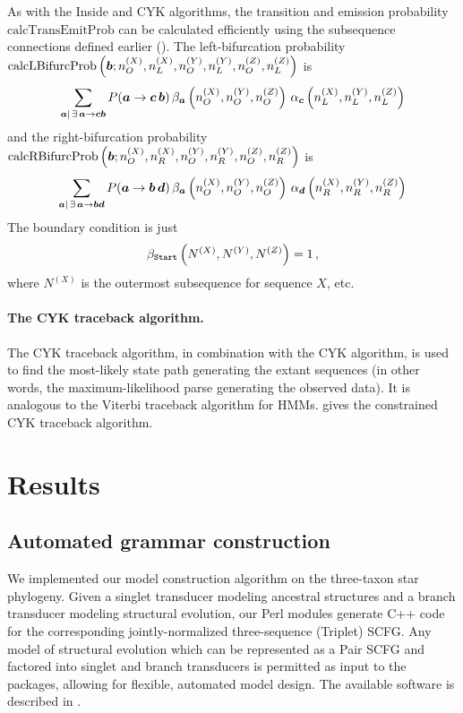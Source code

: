 \documentclass[10pt]{article}
\begin{document}
As with the Inside and CYK algorithms, the transition and emission probability $\mathrm{calcTransEmitProb}$ can be calculated efficiently using the subsequence connections defined earlier ().
The left-bifurcation probability $\mathrm{calcLBifurcProb}\left( \boldsymbol{b}; n^{(X)}_O,n^{(X)}_L,n^{(Y)}_O,n^{(Y)}_L,n^{(Z)}_O,n^{(Z)}_L \right)$ is
\[ \sum_{\boldsymbol{a}|\,\exists\, \boldsymbol{a}\to\boldsymbol{c}\boldsymbol{b}} P (\boldsymbol{a}\to\boldsymbol{c}\,\boldsymbol{b}) \, \beta_{\boldsymbol{a}}\left( n^{(X)}_O,n^{(Y)}_O,n^{(Z)}_O\right) \, \alpha_{\boldsymbol{c}}\left( n^{(X)}_L,n^{(Y)}_L,n^{(Z)}_L\right) \]
and the right-bifurcation probability $\mathrm{calcRBifurcProb}\left( \boldsymbol{b}; n^{(X)}_O,n^{(X)}_R,n^{(Y)}_O,n^{(Y)}_R,n^{(Z)}_O,n^{(Z)}_R \right)$ is
\[ \sum_{\boldsymbol{a}|\,\exists\, \boldsymbol{a}\to\boldsymbol{b}\boldsymbol{d}} P (\boldsymbol{a}\to\boldsymbol{b}\,\boldsymbol{d}) \, \beta_{\boldsymbol{a}}\left( n^{(X)}_O,n^{(Y)}_O,n^{(Z)}_O\right) \, \alpha_{\boldsymbol{d}}\left( n^{(X)}_R,n^{(Y)}_R,n^{(Z)}_R\right) \]
The boundary condition is just
\[
\beta_{\mathtt{Start}} \left(N^{(X)}, N^{(Y)}, N^{(Z)}\right) = 1\, ,
\]
where $N^{(X)}$ is the outermost subsequence for sequence $X$, etc.


\paragraph{The CYK traceback algorithm.}
The CYK traceback algorithm, in combination with the CYK algorithm, is
used to find the most-likely state path generating the extant sequences
(in other words, the maximum-likelihood parse generating the observed data).
It is analogous to the Viterbi traceback algorithm for HMMs.
 gives the constrained CYK traceback algorithm.








\newpage
\section*{Results}



\subsection*{Automated grammar construction}

We implemented our model construction algorithm on the three-taxon
star phylogeny.
Given a singlet transducer modeling ancestral structures and a branch
transducer modeling structural evolution, our Perl modules generate
C++ code for the corresponding jointly-normalized three-sequence
(Triplet) SCFG.
Any model of structural evolution which can be represented as a Pair
SCFG and factored into singlet and branch transducers is permitted as input to
the packages, allowing for flexible, automated model design.
The available software is described in .
\end{document}
